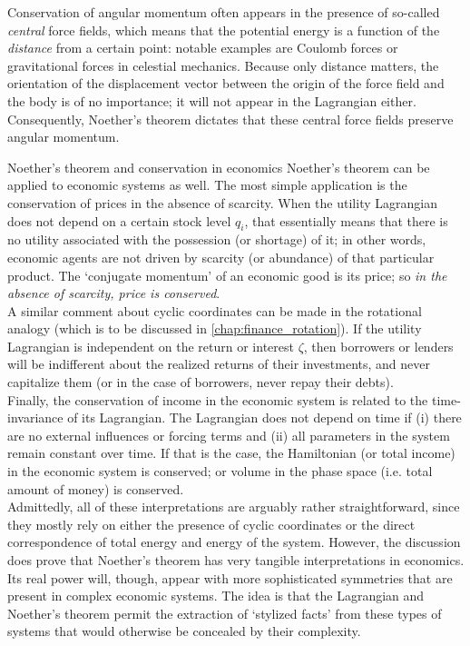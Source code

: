 Conservation of angular momentum often appears in the presence of so-called \emph{central} force fields, which means that the potential energy is a function of the \emph{distance} from a certain point: notable examples are Coulomb forces or gravitational forces in celestial mechanics. Because only distance matters, the orientation of the displacement vector between the origin of the force field and the body is of no importance; it will not appear in the Lagrangian either. Consequently, Noether's theorem dictates that these central force fields preserve angular momentum.

\begin{econ}{Noether's theorem and conservation in economics}
    Noether's theorem can be applied to economic systems as well. The most simple application is the conservation of prices in the absence of scarcity. When the utility Lagrangian does not depend on a certain stock level $q_i$, that essentially means that there is no utility associated with the possession (or shortage) of it; in other words, economic agents are not driven by scarcity (or abundance) of that particular product. The `conjugate momentum' of an economic good is its price; so \emph{in the absence of scarcity, price is conserved}.\\
    
    A similar comment about cyclic coordinates can be made in the rotational analogy (which is to be discussed in \cref{chap:finance_rotation}). If the utility Lagrangian is independent on the return or interest $\zeta$, then borrowers or lenders will be indifferent about the realized returns of their investments, and never capitalize them (or in the case of borrowers, never repay their debts).\\
    
    Finally, the conservation of income in the economic system is related to the time-invariance of its Lagrangian. The Lagrangian does not depend on time if (i) there are no external influences or forcing terms and (ii) all parameters in the system remain constant over time. If that is the case, the Hamiltonian (or total income) in the economic system is conserved; or volume in the phase space (i.e. total amount of money) is conserved.\\
    
    Admittedly, all of these interpretations are arguably rather straightforward, since they mostly rely on either the presence of cyclic coordinates or the direct correspondence of total energy and energy of the system. However, the discussion does prove that Noether's theorem has very tangible interpretations in economics. Its real power will, though, appear with more sophisticated symmetries that are present in complex economic systems. The idea is that the Lagrangian and Noether's theorem permit the extraction of `stylized facts' from these types of systems that would otherwise be concealed by their complexity. 
\end{econ}

